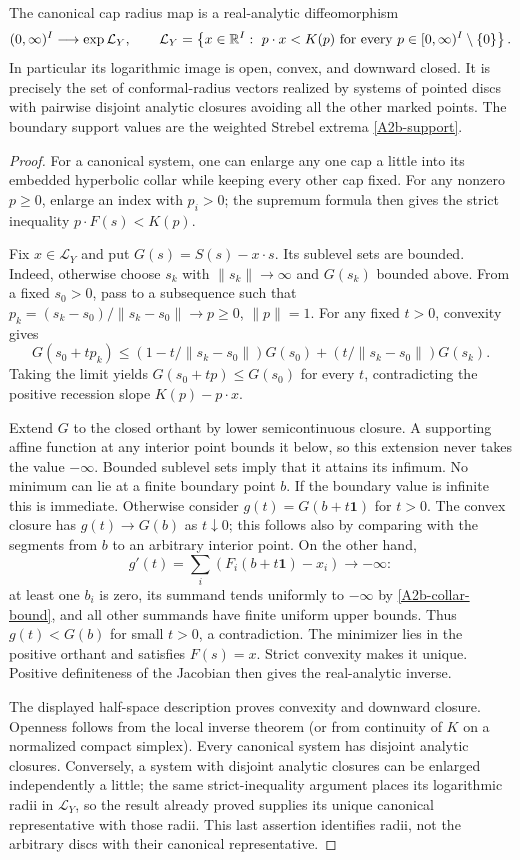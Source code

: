 \begin{theorem}\label{A2b-image}
The canonical cap radius map is a real-analytic diffeomorphism
\[
 (0,\infty)^I\longrightarrow\exp\mathcal L_Y,
 \qquad
 \mathcal L_Y=
 \left\{x\in{\ensuremath{\mathbb{R}}}^I:\ p\cdot x<K(p)
       \text{ for every }p\in[0,\infty)^I\setminus\{0\}\right\}.
\]
In particular its logarithmic image is open, convex, and downward closed.
It is precisely the set of conformal-radius vectors realized by systems
of pointed discs with pairwise disjoint analytic closures avoiding all
the other marked points. The boundary
support values are the weighted Strebel extrema \eqref{A2b-support}.
\end{theorem}
\begin{proof}
For a canonical system, one can enlarge any one cap a little into its
embedded hyperbolic collar while keeping every other cap fixed. For
any nonzero $p\geq0$, enlarge an index with $p_i>0$; the supremum formula
then gives the strict inequality $p\cdot F(s)<K(p)$.

Fix $x\in\mathcal L_Y$ and put $G(s)=S(s)-x\cdot s$.
Its sublevel sets are bounded. Indeed, otherwise choose $s_k$ with
$\|s_k\|\to\infty$ and $G(s_k)$ bounded above. From a fixed $s_0>0$,
pass to a subsequence such that
$p_k=(s_k-s_0)/\|s_k-s_0\|\to p\geq0$, $\|p\|=1$.
For any fixed $t>0$, convexity gives
\[
 G(s_0+tp_k)\leq
 (1-t/\|s_k-s_0\|)G(s_0)
 +(t/\|s_k-s_0\|)G(s_k).
\]
Taking the limit yields $G(s_0+tp)\leq G(s_0)$ for every $t$,
contradicting the positive recession slope $K(p)-p\cdot x$.

Extend $G$ to the closed orthant by lower semicontinuous closure.
A supporting affine function at any interior point bounds it below,
so this extension never takes the value $-\infty$. Bounded sublevel
sets imply that it attains its infimum. No minimum can lie at a finite
boundary point $b$. If the boundary value is infinite this is immediate.
Otherwise consider $g(t)=G(b+t\mathbf1)$ for $t>0$.
The convex closure has $g(t)\to G(b)$ as $t\downarrow0$; this follows
also by comparing with the segments from $b$ to an arbitrary interior
point. On the other hand,
\[
 g'(t)=\sum_i(F_i(b+t\mathbf1)-x_i)\longrightarrow-\infty:
\]
at least one $b_i$ is zero, its summand tends uniformly to $-\infty$
by \eqref{A2b-collar-bound}, and all other summands have finite uniform
upper bounds. Thus $g(t)<G(b)$ for small $t>0$, a contradiction.
The minimizer lies in the positive orthant and satisfies $F(s)=x$.
Strict convexity makes it unique. Positive definiteness of the Jacobian
then gives the real-analytic inverse.

The displayed half-space description proves convexity and downward
closure. Openness follows from the local inverse theorem (or from
continuity of $K$ on a normalized compact simplex). Every canonical
system has disjoint analytic closures. Conversely, a system with
disjoint analytic closures can be enlarged independently a little;
the same strict-inequality argument places its logarithmic radii in
$\mathcal L_Y$, so the result already proved supplies its unique
canonical representative with those radii. This last assertion
identifies radii, not the arbitrary discs with their canonical
representative.
\end{proof}

